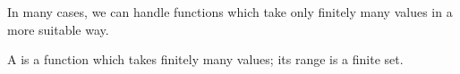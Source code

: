 
\sbasic



\sstart



In many cases, we can handle functions
which take only finitely many values
in a more suitable way.


A
is a function which takes finitely
many values; its range is a finite set.


\strats
